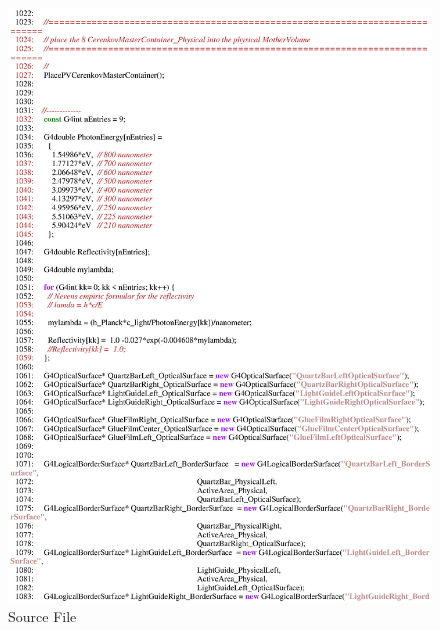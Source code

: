 \begin{figure}[ht]
  \hspace{0cm}
  \includegraphics[scale=0.8]{./figures5/QweakSimCerenkovDetector.cc-p17.eps}
  \caption{\label{SourceV17} Source File}
           \label{fig:V-SC-21}
\end{figure}
\clearpage

